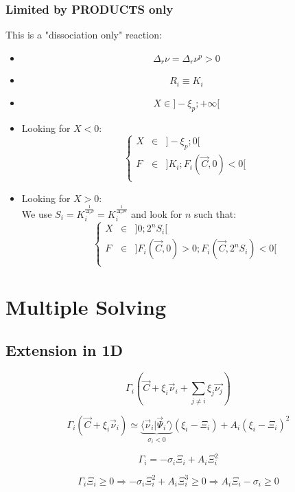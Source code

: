 \documentclass[aps,12pt]{revtex4}
\begin{document}
\subsubsection{Limited by PRODUCTS only}
This is a "dissociation only" reaction:
\begin{itemize}
\item
$$
	\Delta_r \nu =  \Delta_r \nu^p > 0 
$$
\item
$$
	R_i \equiv K_i
$$
\item
$$
	X \in \rbrack -\xi_p; +\infty \lbrack
$$
\item Looking for $X<0$:
$$
 \left\lbrace
 \begin{array}{rcl}
 	X &\in& \rbrack -\xi_p; 0 \lbrack\\
	F &\in& \rbrack K_i; F_i(\vec{C},0)<0 \lbrack\\
\end{array}
\right.
$$
\item Looking for $X>0$:\\
 We use $S_i=K_i^{\frac{1}{\Delta_r \nu}}=K_i^{\frac{1}{\Delta_r \nu^p}}$
 and look for $n$ such that:
 $$
 	\left\lbrace
 \begin{array}{rcl}
 	X &\in& \rbrack 0; 2^n S_i\lbrack\\
	F &\in& \rbrack F_i(\vec{C},0)>0; F_i(\vec{C},2^nS_i)<0 \lbrack\\
\end{array}
\right.
 $$



\end{itemize}
	
	
\section{Multiple Solving}

\subsection{Extension in 1D}

\begin{equation}
	\Gamma_i\left(\vec{C}+\xi_i \vec{\nu}_i + \sum_{j\not=i} \xi_j \vec{\nu_j}\right)
\end{equation}	

\begin{equation}
	\Gamma_i\left(\vec{C}+\xi_i \vec{\nu}_i\right) 
	\simeq 
	\underbrace{\langle \vec{\nu}_i \vert \vec{\Psi}_i' \rangle}_{\sigma_i<0} (\xi_i-\Xi_i) + A_i   (\xi_i-\Xi_i)^2
\end{equation}

\begin{equation}
	\Gamma_i = -\sigma_i \Xi_i + A_i \Xi_i^2
\end{equation}

\begin{equation}
	\Gamma_i \Xi_i \geq 0 \Rightarrow -\sigma_i \Xi_i^2 + A_i \Xi_i^3 \geq 0 \Rightarrow A_i \Xi_i - \sigma_i \geq 0
\end{equation}
\end{document}

